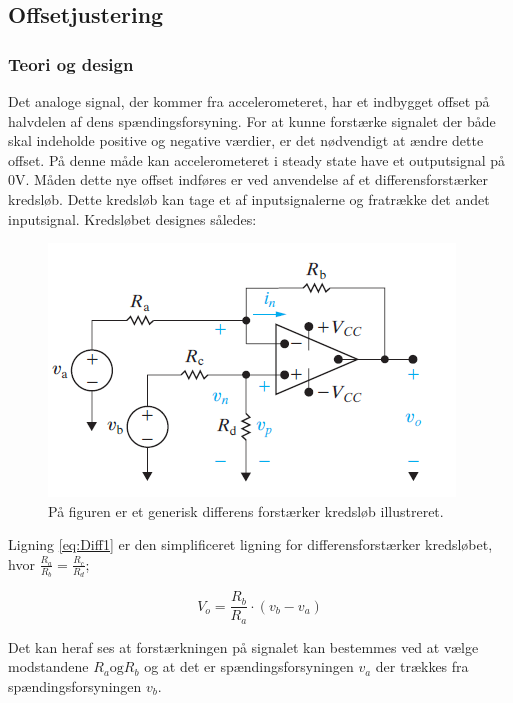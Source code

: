\subsection{Offsetjustering}
\subsubsection{Teori og design}
Det analoge signal, der kommer fra accelerometeret, har et indbygget offset på halvdelen af dens spændingsforsyning. For at kunne forstærke signalet der både skal indeholde positive og negative værdier, er det nødvendigt at ændre dette offset. På denne måde kan  accelerometeret i steady state have et outputsignal på $0$V. Måden dette nye offset indføres er ved anvendelse af et differensforstærker kredsløb. Dette kredsløb kan tage et af inputsignalerne og  fratrække det  andet inputsignal. Kredsløbet designes således:

\begin{figure}[H]
\centering
\includegraphics[scale=1]{figures/cProblemloesning/Differensforstaerker_generisk.png}
\caption{På figuren er et generisk differens forstærker kredsløb illustreret. \cite{Nilsson2011}}
\label{fig:Differensforstaerker_generisk}
\end{figure}

Ligning \ref{eq:Diff1} er den simplificeret ligning for differensforstærker kredsløbet, hvor $\frac{R_a}{R_b} = \frac{R_c}{R_d}$;

\begin{equation}\label{eq:Diff1}
V_o = \frac{R_b}{R_a} \cdot (v_b - v_a)
\end{equation}

Det kan heraf ses at forstærkningen på signalet kan bestemmes ved at vælge modstandene $R_a \text{og} R_b$ og at det er spændingsforsyningen $v_a$ der trækkes fra spændingsforsyningen $v_b$. 

